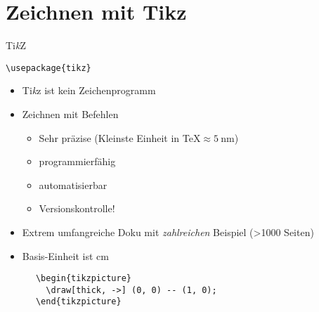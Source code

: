 \section{Zeichnen mit Tikz}

\begin{frame}[fragile]{%
  Ti\textit{k}Z
  \hfill
}
  \begin{Packages}
    \lstinline+\usepackage{tikz}+
  \end{Packages}
  \begin{itemize}
    \item \alert{T}i\textit{k}z \alert{i}st \alert{k}ein \alert{Z}eichenprogramm
    \item Zeichnen mit Befehlen
      \begin{itemize}
        \item Sehr präzise (Kleinste Einheit in \TeX ${} \approx \SI{5}{\nano\meter}$)
        \item programmierfähig
        \item automatisierbar
        \item Versionskontrolle!
      \end{itemize}
    \item Extrem umfangreiche Doku mit \emph{zahlreichen} Beispiel (>\num{1000} Seiten)
    \item Basis-Einheit ist \si{\centi\meter}
  \end{itemize}
  \begin{CodeExample}{0.7}
    \begin{lstlisting}
      \begin{tikzpicture}
        \draw[thick, ->] (0, 0) -- (1, 0);
      \end{tikzpicture}
    \end{lstlisting}
  \CodeResult
  \strut\\
  \end{CodeExample}
\end{frame}
